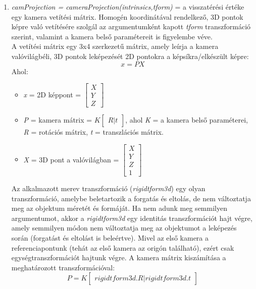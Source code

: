 \documentclass[12pt]{report}
\begin{document}
\begin{enumerate}
                    \item \textit{camProjection = cameraProjection(intrinsics,tform)} = a visszatérési értéke egy kamera vetítési mátrix. Homogén koordinátával rendelkező, 3D pontok képre való vetítésére szolgál az argumentumként kapott \textit{tform} transzformáció szerint, valamint a kamera belső paramétereit is figyelembe véve.\\
                    A vetítési mátrix egy 3x4 szerkezetű mátrix, amely leírja a kamera valóvilágbéli, 3D pontok leképezését 2D pontokra a képsíkra/elkészült képre:
                    \[x = PX\]
                    Ahol:
                    \begin{itemize}
                        \item \textit{x} = 2D képpont = $\begin{bmatrix}X\\Y\\Z\end{bmatrix}$
                            \item \textit{P} = kamera mátrix = $K\begin{bmatrix}R|t\end{bmatrix}$, ahol \textit{K} = a kamera belső paraméterei, \textit{R} = rotációs mátrix, \textit{t} = transzlációs mátrix.
                            \item \textit{X} = 3D pont a valóvilágban = $\begin{bmatrix}X\\Y\\Z\\1\end{bmatrix}$
                    \end{itemize}
                    Az alkalmazott merev transzformáció (\textit{rigidtform3d}) egy olyan transzformáció, amelybe beletartozik a forgatás és eltolás, de nem változtatja meg az objektum méretét és formáját. Ha nem adunk meg semmilyen argumentumot, akkor a \textit{rigidtform3d} egy identitás transzformációt hajt végre, amely semmilyen módon nem változtatja meg az objektumot a leképezés során (forgatást és eltolást is beleértve). Mivel az első kamera a referenciapontunk (tehát az első kamera az origón található), ezért csak egységtranszformációt hajtunk végre.
                    A kamera mátrix kiszámítása a meghatározott transzformációval:
                    \[P = K\begin{bmatrix}rigidtform3d.R|rigidtform3d.t\end{bmatrix}\]
                   

\end{enumerate}
\end{document}
